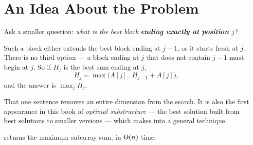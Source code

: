 \section{An Idea About the Problem}

\begin{conceptbox}
Ask a smaller question: \emph{what is the best block \textbf{ending exactly at
position $j$}?}

\smallskip
Such a block either extends the best block ending at $j-1$, or it starts fresh
at $j$. There is no third option --- a block ending at $j$ that does not
contain $j-1$ must begin at $j$. So if $H_{j}$ is the best sum ending at $j$,
\[ H_{j} = \max\bigl(A[j],\; H_{j-1} + A[j]\bigr), \]
and the answer is $\max_{j} H_{j}$.

\smallskip
That one sentence removes an entire dimension from the search. It is also the
first appearance in this book of \emph{optimal substructure} --- the best
solution built from best solutions to smaller versions --- which 
makes into a general technique.
\end{conceptbox}


\begin{theorem}\label{thm:kadane}
 returns the maximum subarray sum, in
$\Theta(n)$ time.
\end{theorem}

